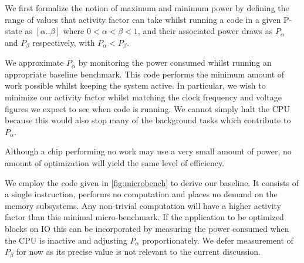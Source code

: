 We first formalize the notion of maximum and minimum power by defining the range of values that activity factor can take whilst running a code in a given P-state as $[\alpha  .. \beta]$ where $0 < \alpha < \beta < 1$, and their associated power draws as $P_{\alpha}$ and $P_{\beta}$ respectively, with $P_{\alpha} < P_{\beta}$. 


We approximate $P_{\alpha}$ by monitoring the power consumed whilst running an appropriate baseline benchmark. This code performs the minimum amount of work possible whilst keeping the system active. In particular, we wish to minimize our activity factor whilst matching the clock frequency and voltage figures we expect to see when code is running. We cannot simply halt the CPU because this would also stop many of the background tasks which contribute to $P_{\alpha}$.

Although a chip performing no work may use a very small amount of power, no amount of optimization will yield the same level of efficiency.


We employ the code given in \autoref{fig:microbench} to derive our baseline.  It consists of a single instruction, performs no computation and places no demand on the memory subsystems. Any non-trivial computation will have a higher activity factor than this minimal micro-benchmark. If the application to be optimized blocks on IO this can be incorporated by measuring the power consumed when the CPU is inactive and adjusting $P_\alpha$ proportionately. We defer measurement of $P_{\beta}$ for now as its precise value is not relevant to the current discussion. 



